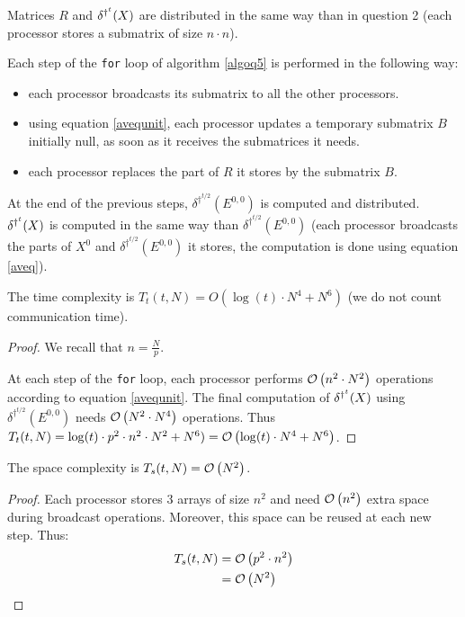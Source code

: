 Matrices $R$ and $\delta^{\dag^t}(X)$ are distributed in the same way than in question 2 (each processor stores a submatrix of size $n \cdot n$).

Each step of the \texttt{for} loop of algorithm \ref{algoq5} is performed in the following way:
\begin{itemize}
 \item each processor broadcasts its submatrix to all the other processors.
 \item using equation \ref{avequnit}, each processor updates a temporary submatrix $B$ initially null, as soon as it receives the submatrices it needs.
 \item each processor replaces the part of $R$ it stores by the submatrix $B$.
\end{itemize}

At the end of the previous steps, $\delta^{\dag^{t/2}}(E^{0,0})$ is computed and distributed. $\delta^{\dag^t}(X)$ is computed in the same way than $\delta^{\dag^{t/2}}(E^{0,0})$ (each processor broadcasts the parts of $X^0$ and $\delta^{\dag^{t/2}}(E^{0,0})$ it stores, the computation is done using equation \ref{aveq}).


\begin{prop}
 The time complexity is $T_t(t,N) = O (\log(t) \cdot N^4 + N^6)$ (we do not count communication time).
\end{prop}

\begin{proof}
 We recall that $n = \frac{N}{p}$.
 
  At each step of the \texttt{for} loop, each processor performs $\mathcal O \left( n^2 \cdot N^2 \right)$ operations according to equation \ref{avequnit}. The final computation of $\delta^{\dag^t}(X)$ using $\delta^{\dag^{t/2}}(E^{0,0})$ needs $\mathcal O \left( N^2 \cdot N^4 \right)$ operations. Thus $T_t(t,N) = \log(t) \cdot p^2 \cdot n^2 \cdot N^2 + N^6) = \mathcal O \left( \log(t) \cdot N^4 + N^6 \right)$.
\end{proof}

\begin{prop}
 The space complexity is $T_s(t,N) = \mathcal O \left( N^2 \right)$.
\end{prop}

\begin{proof}
 Each processor stores 3 arrays of size $n^2$ and need $\mathcal O \left( n^2 \right)$ extra space during broadcast operations. Moreover, this space can be reused at each new step. Thus:
  \[
    \begin{split}
        T_s(t,N) & = \mathcal O \left( p^2 \cdot n^2 \right)\\
                 & = \mathcal O \left( N^2 \right)
    \end{split}
 \] 
\end{proof}

